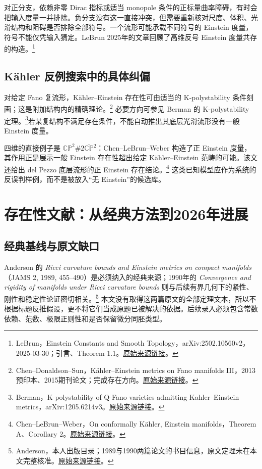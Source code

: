 \documentclass[11pt,a4paper]{article}
\theoremstyle{definition}
\newcommand{\src}[3]{\footnote{\raggedright #1，#2。\href{#3}{原始来源链接}。}}
\begin{document}
对正分支，依赖非零 Dirac 指标或适当 monopole 条件的正标量曲率障碍，有时会把输入度量一并排除。负分支没有这一直接冲突，但需要重新核对尺度、体积、光滑结构和阻碍是否排除全部符号。一个流形可能承载不同符号的 Einstein 度量，符号不能仅凭输入猜定。LeBrun 2025年的文章回顾了高维反号 Einstein 度量共存的构造。\src{LeBrun}{Einstein Constants and Smooth Topology，arXiv:2502.10560v2，2025-03-30；引言、Theorem 1.1}{https://arxiv.org/abs/2502.10560v2}

\subsection{Kähler 反例搜索中的具体纠偏}

对给定 Fano 复流形，Kähler--Einstein 存在性可由适当的 K-polystability 条件刻画；这是附加结构内的精确理论。\src{Chen--Donaldson--Sun}{Kähler--Einstein metrics on Fano manifolds III，2013预印本、2015期刊论文；完成存在方向}{https://arxiv.org/abs/1302.0282}
必要方向可参见 Berman 的 K-polystability 定理。\src{Berman}{K-polystability of Q-Fano varieties admitting Kahler--Einstein metrics，arXiv:1205.6214v3}{https://arxiv.org/abs/1205.6214v3}若某复结构不满足存在条件，不能自动推出其底层光滑流形没有一般 Einstein 度量。

四维的直接例子是 $\mathbb{CP}^2\#2\overline{\mathbb{CP}}{}^2$：Chen--LeBrun--Weber 构造了正 Einstein 度量，其作用正是展示一般 Einstein 存在性超出给定 Kähler--Einstein 范畴的可能。该文还给出 del Pezzo 底层流形的正 Einstein 存在结论。\src{Chen--LeBrun--Weber}{On conformally Kähler, Einstein manifolds，Theorem A、Corollary 2}{https://arxiv.org/abs/0705.0710}
这类已知模型应作为系统的反误判样例，而不是被放入“无 Einstein”的候选库。

\section{存在性文献：从经典方法到2026年进展}\label{sec:existence}

\subsection{经典基线与原文缺口}

Anderson 的 \emph{Ricci curvature bounds and Einstein metrics on compact manifolds}（JAMS 2, 1989, 455--490）是必须纳入的经典来源；1990年的 \emph{Convergence and rigidity of manifolds under Ricci curvature bounds} 则与后续有界几何下的紧性、刚性和稳定性论证密切相关。\src{Anderson}{本人出版目录；1989与1990两篇论文的书目信息，原文定理未在本文完整核准}{https://www.math.stonybrook.edu/~anderson/publ.pdf}
本文没有取得这两篇原文的全部定理文本，所以不根据标题反推假设，更不将它们当成原题已被解决的依据。后续录入必须包含常数依赖、范数、极限正则性和是否保留微分同胚类型。
\end{document}
